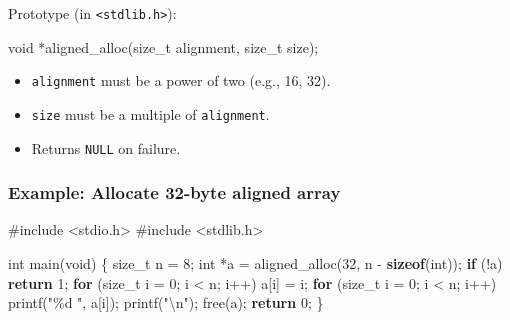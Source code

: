 \documentclass[
  letterpaper,
  DIV=11,
  numbers=noendperiod]{scrreprt}
\newenvironment{Shaded}{\begin{snugshade}}{\end{snugshade}}
\newcommand{\ControlFlowTok}[1]{\textcolor[rgb]{0.00,0.23,0.31}{\textbf{#1}}}
\newcommand{\DataTypeTok}[1]{\textcolor[rgb]{0.68,0.00,0.00}{#1}}
\newcommand{\DecValTok}[1]{\textcolor[rgb]{0.68,0.00,0.00}{#1}}
\newcommand{\ImportTok}[1]{\textcolor[rgb]{0.00,0.46,0.62}{#1}}
\newcommand{\KeywordTok}[1]{\textcolor[rgb]{0.00,0.23,0.31}{\textbf{#1}}}
\newcommand{\NormalTok}[1]{\textcolor[rgb]{0.00,0.23,0.31}{#1}}
\newcommand{\OperatorTok}[1]{\textcolor[rgb]{0.37,0.37,0.37}{#1}}
\newcommand{\PreprocessorTok}[1]{\textcolor[rgb]{0.68,0.00,0.00}{#1}}
\newcommand{\SpecialCharTok}[1]{\textcolor[rgb]{0.37,0.37,0.37}{#1}}
\newcommand{\StringTok}[1]{\textcolor[rgb]{0.13,0.47,0.30}{#1}}
\providecommand{\tightlist}{%
  \setlength{\itemsep}{0pt}\setlength{\parskip}{0pt}}
\begin{document}
Prototype (in \texttt{\textless{}stdlib.h\textgreater{}}):

\begin{Shaded}
\begin{Highlighting}[]
\DataTypeTok{void} \OperatorTok{*}\NormalTok{aligned\_alloc}\OperatorTok{(}\DataTypeTok{size\_t}\NormalTok{ alignment}\OperatorTok{,} \DataTypeTok{size\_t}\NormalTok{ size}\OperatorTok{);}
\end{Highlighting}
\end{Shaded}

\begin{itemize}
\tightlist
\item
  \texttt{alignment} must be a power of two (e.g., 16, 32).
\item
  \texttt{size} must be a multiple of \texttt{alignment}.
\item
  Returns \texttt{NULL} on failure.
\end{itemize}

\subsubsection{Example: Allocate 32-byte aligned
array}\label{example-allocate-32-byte-aligned-array}

\begin{Shaded}
\begin{Highlighting}[]
\PreprocessorTok{\#include }\ImportTok{\textless{}stdio.h\textgreater{}}
\PreprocessorTok{\#include }\ImportTok{\textless{}stdlib.h\textgreater{}}

\DataTypeTok{int}\NormalTok{ main}\OperatorTok{(}\DataTypeTok{void}\OperatorTok{)} \OperatorTok{\{}
    \DataTypeTok{size\_t}\NormalTok{ n }\OperatorTok{=} \DecValTok{8}\OperatorTok{;}
    \DataTypeTok{int} \OperatorTok{*}\NormalTok{a }\OperatorTok{=}\NormalTok{ aligned\_alloc}\OperatorTok{(}\DecValTok{32}\OperatorTok{,}\NormalTok{ n }\OperatorTok{{-}} \KeywordTok{sizeof}\OperatorTok{(}\DataTypeTok{int}\OperatorTok{));}
    \ControlFlowTok{if} \OperatorTok{(!}\NormalTok{a}\OperatorTok{)} \ControlFlowTok{return} \DecValTok{1}\OperatorTok{;}
    \ControlFlowTok{for} \OperatorTok{(}\DataTypeTok{size\_t}\NormalTok{ i }\OperatorTok{=} \DecValTok{0}\OperatorTok{;}\NormalTok{ i }\OperatorTok{\textless{}}\NormalTok{ n}\OperatorTok{;}\NormalTok{ i}\OperatorTok{++)}\NormalTok{ a}\OperatorTok{[}\NormalTok{i}\OperatorTok{]} \OperatorTok{=}\NormalTok{ i}\OperatorTok{;}
    \ControlFlowTok{for} \OperatorTok{(}\DataTypeTok{size\_t}\NormalTok{ i }\OperatorTok{=} \DecValTok{0}\OperatorTok{;}\NormalTok{ i }\OperatorTok{\textless{}}\NormalTok{ n}\OperatorTok{;}\NormalTok{ i}\OperatorTok{++)}\NormalTok{ printf}\OperatorTok{(}\StringTok{"}\SpecialCharTok{\%d}\StringTok{ "}\OperatorTok{,}\NormalTok{ a}\OperatorTok{[}\NormalTok{i}\OperatorTok{]);}
\NormalTok{    printf}\OperatorTok{(}\StringTok{"}\SpecialCharTok{\textbackslash{}n}\StringTok{"}\OperatorTok{);}
\NormalTok{    free}\OperatorTok{(}\NormalTok{a}\OperatorTok{);}
    \ControlFlowTok{return} \DecValTok{0}\OperatorTok{;}
\OperatorTok{\}}
\end{Highlighting}
\end{Shaded}
\end{document}
